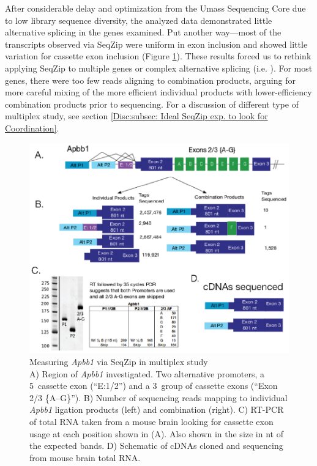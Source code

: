   After considerable delay and optimization from the Umass Sequencing Core due to low library sequence diversity, the analyzed data demonstrated little alternative splicing in the genes examined. Put another way---most of the transcripts observed via SeqZip were uniform in exon inclusion and showed little variation for cassette exon inclusion (Figure \ref{SeqZipMethod:fig:Apbb1 Results}). These results forced us to rethink applying SeqZip to multiple genes or complex alternative splicing (i.e. \dscam{}). For most genes, there were too few reads aligning to combination products, arguing for more careful mixing of the more efficient individual products with lower-efficiency combination products prior to sequencing. For a discussion of different type of multiplex study, see section \ref{Disc:subsec: Ideal SeqZip exp. to look for Coordination}.

  \begin{figure} %
    \centering 
    \includegraphics{Figures/SeqZipMethod/Apbb1.eps}
    \caption[Measuring \textit{Apbb1} via SeqZip in multiplex study]
    {
      Measuring \textit{Apbb1} via SeqZip in multiplex study\\[0.25cm]
      A) Region of \textit{Apbb1} investigated. Two alternative promoters, a 5\textprime~cassette exon (``E:1/2'') and a 3\textprime~group of cassette exons (``Exon 2/3 \{A--G\}''). B) Number of sequencing reads mapping to individual \textit{Apbb1} ligation products (left) and combination (right). C) RT-PCR of total RNA taken from a mouse brain looking for cassette exon usage at each position shown in (A). Also shown in the size in nt of the expected bands. D) Schematic of cDNAs cloned and sequencing from mouse brain total RNA.
      }
    \label{SeqZipMethod:fig:Apbb1 Results}
    \end{figure}

